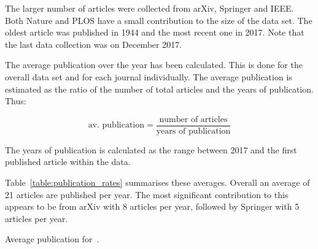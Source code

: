 \documentclass{article}
\begin{document}
The larger number of articles were collected from arXiv, Springer and IEEE. Both
Nature and PLOS have a small contribution to the size of the data set. The oldest
article was published in 1944 and the most recent one in 2017. Note
that the last data collection was on December 2017.

The average publication over the year has been calculated. This is done for the overall
data set and for each journal individually. The average publication is estimated
as the ratio of the number of total articles and the years of publication.
Thus:

\[ \text{av. publication}= \frac{\text{number of articles}}{\text{years of publication}}\]

The years of publication is calculated as the range between 2017 and the first published
article within the data.

Table~\ref{table:publication_rates} summarises these averages. Overall an average of
21 articles are published per year. The most significant contribution to this
appears to be from arXiv with 8 articles per year, followed by Springer with 5
articles per year.

\begin{table}[!hbtp]
    \begin{center}
    
    \end{center}
    \caption{Average publication for~\cite{}.}
    \label{table:publication_rates}
\end{table}


\end{document}
